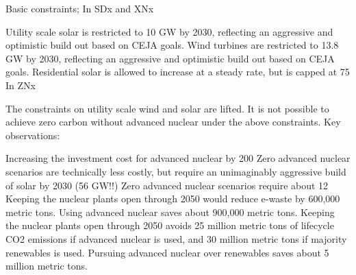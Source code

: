 Basic constraints;
In SDx and XNx

Utility scale solar is restricted to 10 GW by 2030, reflecting an aggressive and optimistic build out based on CEJA goals.
Wind turbines are restricted to 13.8 GW by 2030, reflecting an aggressive and optimistic build out based on CEJA goals.
Residential solar is allowed to increase at a steady rate, but is capped at 75%
In ZNx

The constraints on utility scale wind and solar are lifted. It is not possible to achieve zero carbon without advanced nuclear under the above constraints.
Key observations:

Increasing the investment cost for advanced nuclear by 200%
Zero advanced nuclear scenarios are technically less costly, but require an unimaginably aggressive build of solar by 2030 (56 GW!!)
Zero advanced nuclear scenarios require about 12%
Keeping the nuclear plants open through 2050 would reduce e-waste by 600,000 metric tons. Using advanced nuclear saves about 900,000 metric tons.
Keeping the nuclear plants open through 2050 avoids 25 million metric tons of lifecycle CO2 emissions if advanced nuclear is used, and 30 million metric tons if majority renewables is used. Pursuing advanced nuclear over renewables saves about 5 million metric tons.


